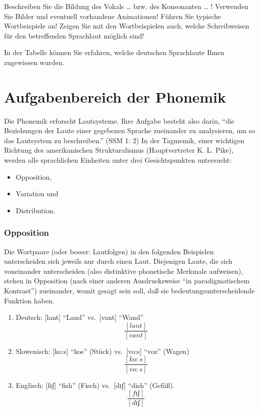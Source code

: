 \documentclass[
  letterpaper,
]{scrbook}
\begin{document}
Beschreiben Sie die Bildung des Vokals \ldots{} bzw. des Konsonanten
\ldots{} ! Verwenden Sie Bilder und eventuell vorhandene Animationen!
Führen Sie typische Wortbeispiele an! Zeigen Sie mit den Wortbeispielen
auch, welche Schreibweisen für den betreffenden Sprachlaut möglich sind!

In der Tabelle können Sie erfahren, welche deutschen Sprachlaute Ihnen
zugewiesen wurden.

\hypertarget{sec-phonemik}{%
\chapter{Aufgabenbereich der Phonemik}\label{sec-phonemik}}

Die Phonemik erforscht Lautsysteme. Ihre Aufgabe besteht also darin,
``die Beziehungen der Laute einer gegebenen Sprache zueinander zu
analysieren, um so das Lautsystem zu beschreiben.'' (SSM 1: 2) In der
Tagmemik, einer wichtigen Richtung des amerikanischen Strukturalismus
(Hauptvertreter K. L. Pike), werden alle sprachlichen Einheiten unter
drei Gesichtspunkten untersucht:

\begin{itemize}
\item
  Opposition,
\item
  Variation und
\item
  Distribution.
\end{itemize}

\hypertarget{opposition}{%
\subsection{Opposition}\label{opposition}}

Die Wortpaare (oder besser: Lautfolgen) in den folgenden Beispielen
unterscheiden sich jeweils nur durch einen Laut. Diejenigen Laute, die
sich voneinander unterscheiden (also distinktive phonetische Merkmale
aufweisen), stehen in Opposition (nach einer anderen Ausdrucksweise ``in
paradigmatischem Kontrast'') zueinander, womit gesagt sein soll, daß sie
bedeutungsunterscheidende Funktion haben.

\begin{enumerate}
\def\labelenumi{(\arabic{enumi})}
\setcounter{enumi}{7}
\item
  Deutsch: {[}lant{]} ``Land'' vs.~{[}vant{]} ``Wand''\\
  \[
  \frac{[lant]}{[vant]}
  \]
\item
  Slowenisch: {[}ko:s{]} ``kos'' (Stück) vs.~{[}vo:s{]} ``voz''
  (Wagen)\\
  \[
  \frac{[ko:s]}{[vo:s]}
  \]
\item
  Englisch: {[}fɪʃ{]} ``fish'' (Fisch) vs.~{[}dɪʃ{]} ``dish'' (Gefäß).\\
  \[
  \frac{[fɪʃ]}{[dɪʃ]}
  \]
\end{enumerate}
\end{document}
